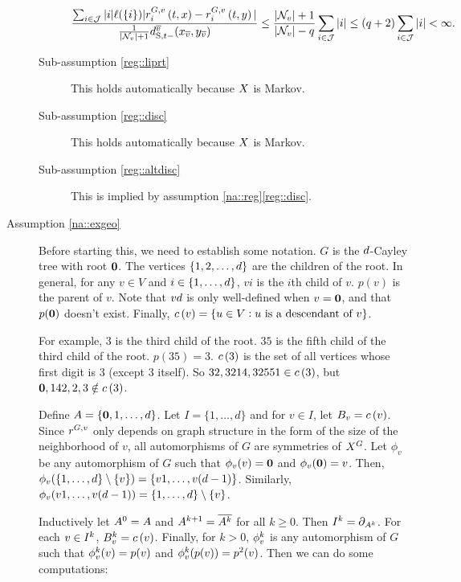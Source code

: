 \begin{description}
\begin{description}
\[\frac{\sum_{i\in\jmps}|i|\Sm(\{i\})|\rate\gvpara{G}{v}\stpara{i}\tmepro{t}{\xf}{} - \rate\gvpara{G}{v}\stpara{i}\tmepro{t}{\xg}{}|}{\frac{1}{|\neigh{v}|+1}\stmet{t-}^{\cl{v}}(\xf\vind{\cl{v}},\xg\vind{\cl{v}})}\leq \frac{|\neigh{v}|+1}{|\neigh{v}|-q}\sum_{i\in\jmps}|i|\leq (q+2)\sum_{i\in\jmps}|i| < \infty.\]

\item[Sub-assumption \ref{reg::liprt}] This holds automatically because \(X\) is Markov.

\item[Sub-assumption \ref{reg::disc}] This holds automatically because \(X\) is Markov.

\item[Sub-assumption \ref{reg::altdisc}] This is implied by assumption \ref{na::reg}\ref{reg::disc}.
\end{description}

\item[Assumption \ref{na::exgeo}] 

Before starting this, we need to establish some notation. \(G\) is the \(d\)-Cayley tree with root \(\mathbf{0}\). The vertices \(\{1,2,\dots,d\}\) are the children of the root. In general, for any \(v \in V\) and \(i \in \{1,\dots,d\}\), \(vi\) is the \(i\)th child of \(v\). \(p(v)\) is the parent of \(v\). Note that \(vd\) is only well-defined when \(v = \mathbf{0}\), and that \(p(\mathbf{0})\) doesn't exist. Finally, \(c\left(v\right) = \{u \in V: u\text{ is a descendant of } v\}\).

\ind For example, \(3\) is the third child of the root. \(35\) is the fifth child of the third child of the root. \(p(35) = 3\). \(c\left(3\right)\) is the set of all vertices whose first digit is 3 (except 3 itself). So \(32,3214,32551 \in c\left(3\right)\), but \(\mathbf{0},142,2,3 \notin c\left(3\right)\).

\ind Define \(A = \{\mathbf{0},1,\dots,d\}\). Let \(I = \{1,\dots,d\}\) and for \(v\in I\), let \(B_v = c\left(v\right)\). Since \(r^{G,v}\) only depends on graph structure in the form of the size of the neighborhood of \(v\), all automorphisms of \(G\) are symmetries of \(X^{G}\). Let \(\phi_v\) be any automorphism of \(G\) such that \(\phi_v(v) = \mathbf{0}\) and \(\phi_v(\mathbf{0}) = v\). Then, \(\phi_v(\{1,\dots,d\}\setminus \{v\}) = \{v1,\dots,v(d-1)\}\). Similarly, \(\phi_v(v1,\dots,v(d-1)) = \{1,\dots,d\}\setminus\{v\}\).

\ind Inductively let \(A^{0} = A\) and \(A^{k+1} = \overline{A^{k}}\) for all \(k \geq 0\). Then \(I^{k} = \partial_{A^{k}}\). For each \(v \in I^{k}\), \(B^{k}_v = c\left(v\right)\). Finally, for \(k > 0\), \(\phi^{k}_v\) is any automorphism of \(G\) such that \(\phi^{k}_v(v) = p(v)\) and \(\phi^{k}_v(p(v)) = p^2(v)\). Then we can do some computations:


\end{description}
